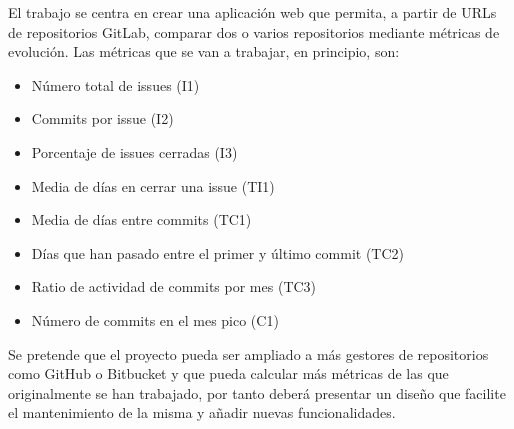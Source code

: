 
El trabajo se centra en crear una aplicación web que permita, a partir de URLs de repositorios GitLab, comparar dos o varios repositorios mediante métricas de evolución.
Las métricas que se van a trabajar, en principio, son:
\begin{itemize}
	\item Número total de issues (I1)
	\item Commits por issue (I2)
	\item Porcentaje de issues cerradas (I3)
	\item Media de días en cerrar una issue (TI1)
	\item Media de días entre commits (TC1)
	\item Días que han pasado entre el primer y último commit (TC2)
	\item Ratio de actividad de commits por mes (TC3)
	\item Número de commits en el mes pico (C1)
\end{itemize}
Se pretende que el proyecto pueda ser ampliado a más gestores de repositorios como GitHub o Bitbucket y que pueda calcular más métricas de las que originalmente se han trabajado, por tanto deberá presentar un diseño que facilite el mantenimiento de la misma y añadir nuevas funcionalidades.
